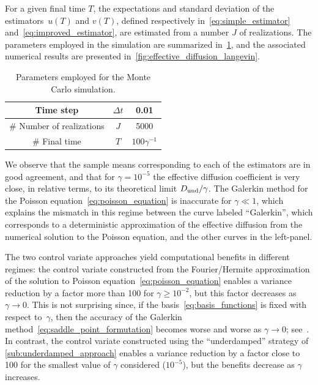 \documentclass[11pt,a4paper]{article}
\begin{document}

For a given final time $T$,
the expectations and standard deviation of the estimators~$u(T)$ and $v(T)$,
defined respectively in~\eqref{eq:simple_estimator} and~\eqref{eq:improved_estimator},
are estimated from a number $J$ of realizations.
The parameters employed in the simulation are summarized in~\cref{table:parameters_employed_for_mc},
and the associated numerical results are presented in~\cref{fig:effective_diffusion_langevin}.
\begin{table}[ht]
    \centering
    \begin{tabular}{|c|c|c|}
        \hline
        Time step & $\Delta t$ & 0.01 \\
        \hline
        \# Number of realizations & $J$ & 5000 \\
        \hline
        \# Final time & $T$ & $100 \gamma^{-1}$ \\
        \hline
    \end{tabular}
    \caption{Parameters employed for the Monte Carlo simulation.}
    \label{table:parameters_employed_for_mc}
\end{table}
We observe that the sample means corresponding to each of the estimators are in good agreement,
and that for $\gamma = 10^{-5}$ the effective diffusion coefficient is very close, in relative terms,
to its theoretical limit $D_{\rm und}/\gamma$.
The Galerkin method for the Poisson equation~\eqref{eq:poisson_equation} is inaccurate for $\gamma \ll 1$,
which explains the mismatch in this regime between the curve labeled ``Galerkin'',
which corresponds to a deterministic approximation of the effective diffusion from the numerical solution to the Poisson equation,
and the other curves in the left-panel.

The two control variate approaches yield computational benefits in different regimes:
the control variate constructed from the Fourier/Hermite approximation of the solution to Poisson equation~\eqref{eq:poisson_equation}
enables a variance reduction by a factor more than 100 for $\gamma \geq 10^{-2}$,
but this factor decreases as $\gamma \to 0$.
This is not surprising since,
if the basis~\eqref{eq:basis_functions} is fixed with respect to~$\gamma$,
then the accuracy of the Galerkin method~\eqref{eq:saddle_point_formutation} becomes worse and worse as $\gamma \to 0$;
see~\cite{roussel2018spectral}.
In contrast, the control variate constructed using the ``underdamped'' strategy of \cref{sub:underdamped_approach} enables a variance reduction by a factor close to 100 for the smallest value of $\gamma$ considered ($10^{-5}$),
but the benefits decrease as $\gamma$ increases.
\end{document}
